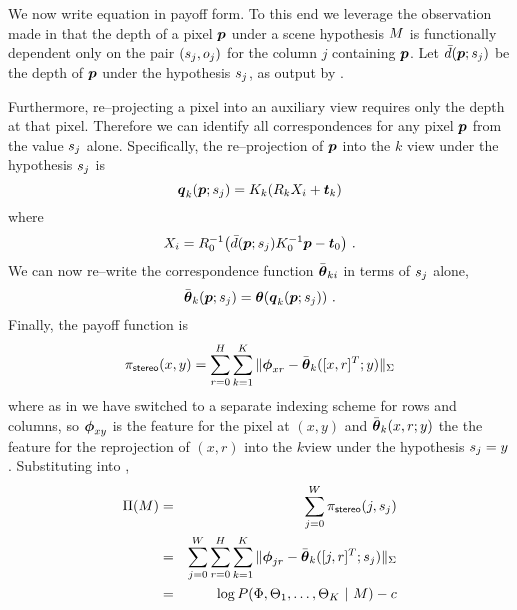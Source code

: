 We now write equation  in payoff form. To this
end we leverage the observation made in 
that the depth of a pixel $\Pixel$ under a scene hypothesis $\Scene$
is functionally dependent only on the pair $(\seam_j,\WallOrient_j)$
for the column $j$ containing $\Pixel$. Let
$\ComputedDepth(\Pixel;\seam_j)$ be the depth of $\Pixel$ under
the hypothesis $\seam_j$, as output by .

Furthermore, re--projecting a pixel into an auxiliary view requires
only the depth at that pixel. Therefore we can identify all
correspondences for any pixel $\Pixel$ from the value $\seam_j$
alone. Specifically, the re--projection of $\Pixel$ into the $k$\th
view under the hypothesis $\seam_j$ is
\begin{equation}
  \AuxPixel_k(\Pixel;\seam_j) = \CamMatrix_k (\CamR_k X_i + \CamTr_k)
\end{equation}
where
\begin{equation}
  X_i = 
  \CamR_0^{-1} \bigl(
    \bar{\Depth}(\Pixel;\seam_j) \CamMatrix_0^{-1} \Pixel - \CamTr_0
  \bigr) ~.
\end{equation}
We can now re--write the correspondence function
$\ComputedAuxFeature_{ki}$ in terms of $\seam_j$ alone,
\begin{equation}
  \ComputedAuxFeature_k(\Pixel;\seam_j) = 
    \AuxFeature(\AuxPixel_k(\Pixel;\seam_j)) ~.
\end{equation}
Finally, the payoff function is
\begin{equation}
  \label{eq:stereo-payoffs}
  \StereoPayoff(x,y) = \sum_{r=0}^H \sum_{k=1}^{\NumViews}
    \| \Feature_{xr} - \ComputedAuxFeature_k([x,r]^T;y) \|_\Sigma
\end{equation}
where as in  we have switched to a separate
indexing scheme for rows and columns, so $\Feature_{xy}$ is the
feature for the pixel at $(x,y)$ and $\ComputedAuxFeature_k(x,r;y)$
the the feature for the reprojection of $(x,r)$ into the $k$\th view
under the hypothesis $\seam_j=y$. Substituting 
into ,
\begin{eqnarray}
  \ScenePayoff(\Scene) &=& 
    \sum_{j=0}^W \StereoPayoff(j,\seam_j)\\
  &=&
    \sum_{j=0}^W \sum_{r=0}^H \sum_{k=1}^{\NumViews}
    \| \Feature_{jr} - \ComputedAuxFeature_k([j,r]^T;\seam_j) \|_\Sigma\\
  &=&
    \log P(\Features,\AuxFeatures_1,\ldots,\AuxFeatures_{\NumViews}
             ~|~ \Scene) - c
\end{eqnarray}

